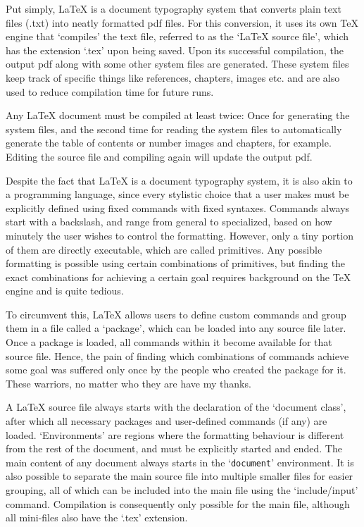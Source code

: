 \documentclass[12pt,twoside]{article}
\begin{document}
Put simply, \LaTeX{} is a document typography system that converts plain text files (.txt) into neatly formatted pdf files. For this conversion, it uses its own TeX engine that `compiles' the text file, referred to as the `LaTeX source file', which has the extension `.tex' upon being saved.  Upon its successful compilation, the output pdf along with some other system files are generated. These system files keep track of specific things like  references, chapters, images etc. and  are also used to reduce compilation time for future runs.

Any \LaTeX{} document must be compiled at least twice: Once for generating the system files, and the second time for reading the system files to automatically generate the table of contents or number images and chapters, for example. Editing the source file and compiling again will update the output pdf.

Despite the fact that \LaTeX{} is a document typography system, it is also akin to a programming language, since every stylistic choice that a user makes must be explicitly defined using fixed commands with fixed syntaxes. Commands always start with a backslash, and range from general to specialized, based on how minutely the user wishes to control the formatting. However,  only  a tiny portion of them are directly executable, which are called primitives. Any possible formatting is possible using certain combinations of primitives, but finding the exact combinations for achieving a certain goal requires background on the TeX engine and is  quite tedious.

To circumvent this, \LaTeX{} allows users to define custom commands and group them in a file called a `package', which can be loaded into any source file later. Once a package is loaded, all commands within it become available for that source file. Hence, the pain of finding which combinations of commands achieve some goal was suffered only once by the people who created the package for it. These  warriors, no matter who they are have my thanks.

A \LaTeX{} source file always starts with the declaration of the `document class', after which all necessary packages and user-defined commands (if any) are loaded. `Environments' are regions where the formatting behaviour is different from the rest of the document, and must be explicitly started and ended. The main content of any document always starts in the `\texttt{document}' environment. It is also possible to separate the main source file  into multiple smaller files for easier grouping, all of which can be included into the main file using the `include/input' command. Compilation is consequently only possible for the main file, although all mini-files also have the `.tex' extension.
\end{document}

